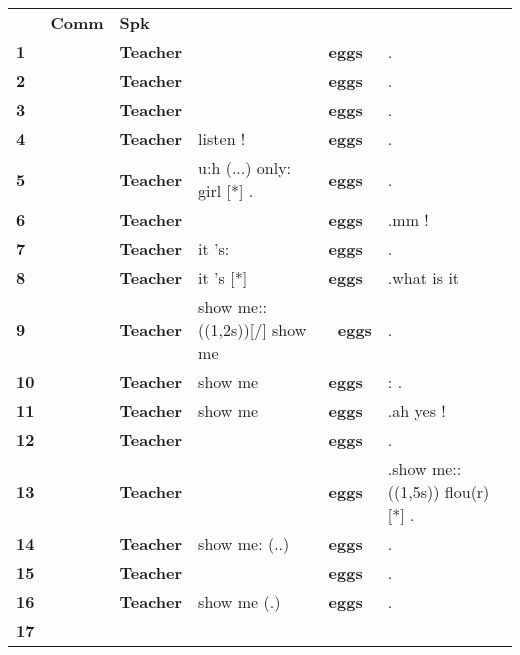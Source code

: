 \documentclass[11pt]{article}
\begin{document}
\begin{flushleft}
\tablefirsthead{}
\tablehead{}
\tabletail{}
\tablelasttail{}
\begin{supertabular}{m{0.16085985in}m{0.34345984in}m{0.42475984in}m{1.5934598in}m{0.23095986in}m{1.6990598in}}
 &
\textbf{Comm} &
\textbf{Spk} &
 &
 &
\\
\raggedleft \textbf{1} &
 &
\textbf{Teacher} &
 &
\centering \textbf{eggs} &
.\\
\raggedleft \textbf{2} &
 &
\textbf{Teacher} &
 &
\centering \textbf{eggs} &
.\\
\raggedleft \textbf{3} &
 &
\textbf{Teacher} &
 &
\centering \textbf{eggs} &
.\\
\raggedleft \textbf{4} &
 &
\textbf{Teacher} &
\raggedleft listen ! &
\centering \textbf{eggs} &
.\\
\raggedleft \textbf{5} &
 &
\textbf{Teacher} &
\raggedleft u:h (...) only: girl [*] .  &
\centering \textbf{eggs} &
.\\
\raggedleft \textbf{6} &
 &
\textbf{Teacher} &
 &
\centering \textbf{eggs} &
.mm !\\
\raggedleft \textbf{7} &
 &
\textbf{Teacher} &
\raggedleft it 's:  &
\centering \textbf{eggs} &
.\\
\raggedleft \textbf{8} &
 &
\textbf{Teacher} &
\raggedleft it 's [*]  &
\centering \textbf{eggs} &
.what is it\\
\raggedleft \textbf{9} &
 &
\textbf{Teacher} &
\raggedleft show me::((1,2s))[/] show me  &
\centering \textbf{\ eggs} &
.\\
\raggedleft \textbf{10} &
 &
\textbf{Teacher} &
\raggedleft show me  &
\centering \textbf{eggs} &
: .\\
\raggedleft \textbf{11} &
 &
\textbf{Teacher} &
\raggedleft show me  &
\centering \textbf{eggs} &
.ah yes !\\
\raggedleft \textbf{12} &
 &
\textbf{Teacher} &
 &
\centering \textbf{eggs} &
.\\
\raggedleft \textbf{13} &
 &
\textbf{Teacher} &
 &
\centering \textbf{eggs} &
.show me::((1,5s)) flou(r) [*] .\\
\raggedleft \textbf{14} &
 &
\textbf{Teacher} &
\raggedleft show me: (..)  &
\centering \textbf{eggs} &
.\\
\raggedleft \textbf{15} &
 &
\textbf{Teacher} &
 &
\centering \textbf{eggs} &
.\\
\raggedleft \textbf{16} &
 &
\textbf{Teacher} &
\raggedleft show me (.)  &
\centering \textbf{eggs} &
.\\
\raggedleft \textbf{17} &

\end{supertabular}
\end{flushleft}
\end{document}
